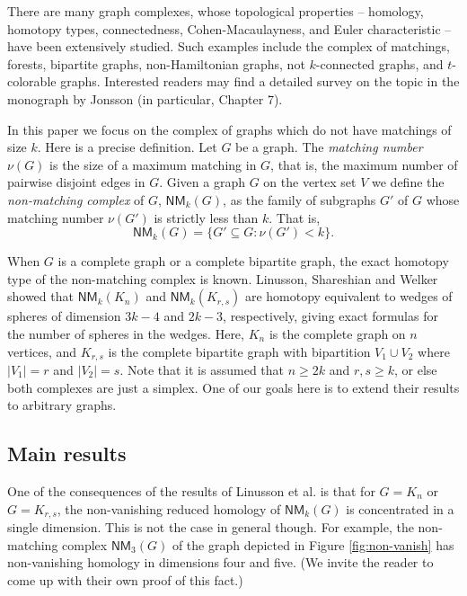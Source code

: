 \documentclass[10pt]{amsart}
\newcommand{\NM}{\mathsf{NM}}
\theoremstyle{definition}
\begin{document}
	There are many graph complexes, whose topological properties -- homology, homotopy types, connectedness, Cohen-Macaulayness, and Euler characteristic -- have been extensively studied. Such examples include the complex of matchings, forests, bipartite graphs, non-Hamiltonian graphs, not $k$-connected graphs, and $t$-colorable graphs. Interested readers may find a detailed survey on the topic in the monograph by Jonsson \cite{jonsson_complex_graph} (in particular, Chapter 7).  
	
	\vspace{1ex}
	
	In this paper we focus on the complex of graphs which do not have matchings of size $k$. Here is a precise definition. Let $G$ be a graph. The {\em matching number} $\nu(G)$ is the size of a maximum matching in $G$, that is, the maximum number of pairwise disjoint edges in $G$. Given a graph $G$ on the vertex set $V$ we define the {\em non-matching complex} of $G$,  $\NM_k(G)$, as the family of subgraphs $G'$ of $G$ whose matching number $\nu(G')$ is strictly less than $k$. That is,
	\[\NM_k(G) = \{ G' \subseteq G: \nu(G')< k  \}.\]
	
	When $G$ is a complete graph or a complete bipartite graph, the exact homotopy type of the non-matching complex is known.
	Linusson, Shareshian and Welker \cite{linusson_bounded_matching_complex} 
	showed that $\NM_k(K_n)$ and $\NM_k(K_{r,s})$ are homotopy equivalent to wedges of spheres of dimension $3k-4$ and $2k-3$, respectively, giving exact formulas for the number of spheres in the wedges. Here, $K_n$ is the complete graph on $n$ vertices, and $K_{r,s}$ is the complete bipartite graph with bipartition $V_1\cup V_2$ where $|V_1|=r$ and $|V_2|=s$. Note that it is assumed that $n\geq 2k$ and $r,s\geq k$, or else both complexes are just a simplex. One of our goals here is to extend their results to arbitrary graphs.
	
	\subsection{Main results} \label{subs:mains}
	One of the consequences of the results of Linusson et al. is that for $G=K_n$ or $G=K_{r,s}$, the non-vanishing reduced homology of $\NM_k(G)$ is concentrated in a single dimension. This is not the case in general though. For example, the non-matching complex $\mathsf{NM}_3(G)$ of the graph depicted in Figure \ref{fig:non-vanish} has non-vanishing homology in dimensions four and five. (We invite the reader to come up with their own proof of this fact.)
	
\end{document}
